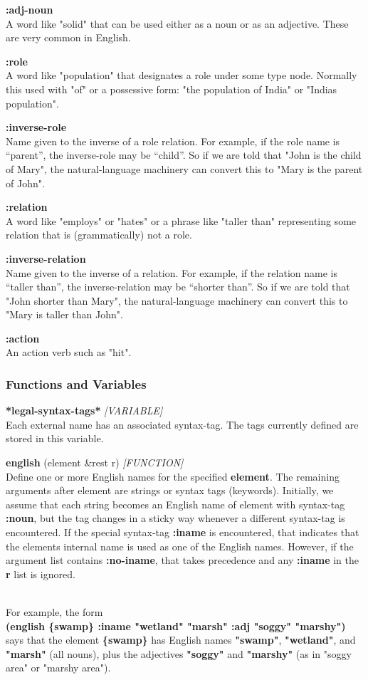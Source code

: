 \documentclass[titlepage,twoside,openright,11pt]{article}
\begin{document}
\textbf{:adj-noun\\
}A word like "solid" that can be used either as a noun or as an
adjective. These are very common in English.

\textbf{:role\\
}A word like "population" that designates a role under some type node.
Normally this used with "of" or a possessive form: "the population of
India" or "India\textquotesingle s population".

\textbf{:inverse-role\\
}Name given to the inverse of a role relation. For example, if the role
name is ``parent'', the inverse-role may be ``child''. So if we are told
that "John is the child of Mary", the natural-language machinery can
convert this to "Mary is the parent of John".

\textbf{:relation\\
}A word like "employs" or "hates" or a phrase like "taller than"
representing some relation that is (grammatically) not a role.

\textbf{:inverse-relation\\
}Name given to the inverse of a relation. For example, if the relation
name is ``taller than'', the inverse-relation may be ``shorter than''.
So if we are told that "John shorter than Mary", the natural-language
machinery can convert this to "Mary is taller than John".

\textbf{:action\\
}An action verb such as "hit".

\subsubsection{Functions and Variables}\label{functions-and-variables-3}

\textbf{*legal-syntax-tags*} \emph{{[}VARIABLE{]}}\\
Each external name has an associated syntax-tag. The tags currently
defined are stored in this variable.

\textbf{english} (element \&rest r) \emph{{[}FUNCTION{]}}\\
Define one or more English names for the specified \textbf{element}. The
remaining arguments after element are strings or syntax tags (keywords).
Initially, we assume that each string becomes an English name of element
with syntax-tag \textbf{:noun}, but the tag changes in a sticky way
whenever a different syntax-tag is encountered. If the special
syntax-tag \textbf{:iname} is encountered, that indicates that the
element\textquotesingle s internal name is used as one of the English
names. However, if the argument list contains \textbf{:no-iname}, that
takes precedence and any \textbf{:iname} in the \textbf{r} list is
ignored.\\
\strut \\
For example, the form\\
\textbf{(english \{swamp\} :iname "wetland" "marsh" :adj "soggy"
"marshy")}\\
says that the element \textbf{\{swamp\}} has English names
\textbf{"swamp"}, \textbf{"wetland"}, and \textbf{"marsh"} (all nouns),
plus the adjectives \textbf{"soggy"} and \textbf{"marshy"} (as in "soggy
area" or "marshy area").
\end{document}
